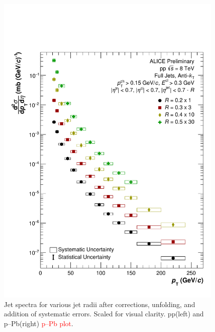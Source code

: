 \documentclass[ALICE]{ALICE_analysis_notes}
\newcommand{\pPb}{{\mbox{p--Pb}}\xspace}
\newcommand{\pp}{pp\xspace}
\begin{document}
\begin{figure}
    \centering
    \includegraphics[width=15cm]{figures/FinalResults/Bayes_reg6.pdf}
    \caption{Jet spectra for various jet radii after corrections, unfolding, and addition of systematic errors. Scaled for visual clarity. \pp (left) and \pPb (right) \textcolor{red}{\pPb plot}.}
    \label{fig:finalSpectra}
\end{figure}
\end{document}

